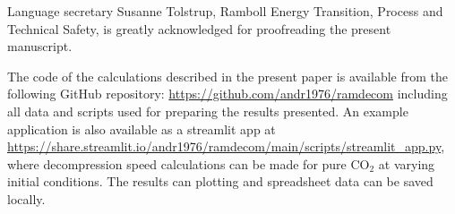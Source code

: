 \documentclass[a4paper, 10pt, twocolumn, twoside]{scrartcl}
\begin{document}
\Acknowledgement
Language secretary Susanne Tolstrup, Ramboll Energy Transition, Process and Technical Safety, is greatly acknowledged for proofreading the present manuscript.  






\Appendix
The code of the calculations described in the present paper is available from the following GitHub repository: \url{https://github.com/andr1976/ramdecom} including all data and scripts used for preparing the results presented. An example application is also available as a streamlit app at \url{https://share.streamlit.io/andr1976/ramdecom/main/scripts/streamlit_app.py}, where decompression speed calculations can be made for pure CO$_2$ at varying initial conditions. The results can plotting and spreadsheet data can be saved locally.
\end{document}
